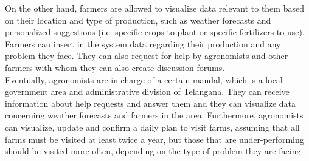 On the other hand, farmers are allowed to visualize data relevant to them based on their location and type of production, such as weather forecasts and personalized suggestions (i.e. specific crops to plant or specific fertilizers to use). Farmers can insert in the system data regarding their production and any problem they face. They can also request for help
by agronomists and other farmers with whom they can also create discussion forums.\\

Eventually, agronomists are in charge of a certain mandal, which is a local government area and administrative division of Telangana. They can receive information about help requests and answer them and they can visualize data concerning weather forecasts and farmers in the area. Furthermore, agronomists can visualize, update and confirm a daily plan to visit farms, assuming that all farms must be visited at least twice a year, but those that are under-performing should be visited more often, depending on the type of problem they are facing.

